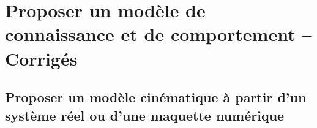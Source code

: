 \begin{multicols}{2}
\renewcommand{\td}{14_Sympact}
\graphicspath{{\repStyle/png/}{\repExo/\td/images/}}


\renewcommand{\td}{15_SympactGalet}
\graphicspath{{\repStyle/png/}{\repExo/\td/images/}}


\renewcommand{\td}{16_Poussoir}
\graphicspath{{\repStyle/png/}{\repExo/\td/images/}}


\renewcommand{\td}{17_4Barres}
\graphicspath{{\repStyle/png/}{\repExo/\td/images/}}


\renewcommand{\td}{18_Maxpid}
\graphicspath{{\repStyle/png/}{\repExo/\td/images/}}


\end{multicols}


\newpage

\section{Proposer un modèle de connaissance et de comportement -- Corrigés}
\subsection{Proposer un modèle cinématique à partir d'un système réel ou d'une maquette numérique}
\proftrue

\renewcommand{\repExo}{../../ExercicesCompetences/B2_ProposerModele/B2_12_ModeliserSchemaCinematiques}
\renewcommand{\td}{01_T}
\graphicspath{{\repStyle/png/}{\repExo/\td/images/}}


\renewcommand{\td}{02_R}
\graphicspath{{\repStyle/png/}{\repExo/\td/images/}}


\renewcommand{\td}{03_TT}
\graphicspath{{\repStyle/png/}{\repExo/\td/images/}}


\renewcommand{\td}{04_RR}
\graphicspath{{\repStyle/png/}{\repExo/\td/images/}}


\renewcommand{\td}{05_RT}
\graphicspath{{\repStyle/png/}{\repExo/\td/images/}}


\renewcommand{\td}{06_TR}
\graphicspath{{\repStyle/png/}{\repExo/\td/images/}}


\renewcommand{\td}{07_RR3D}
\graphicspath{{\repStyle/png/}{\repExo/\td/images/}}


